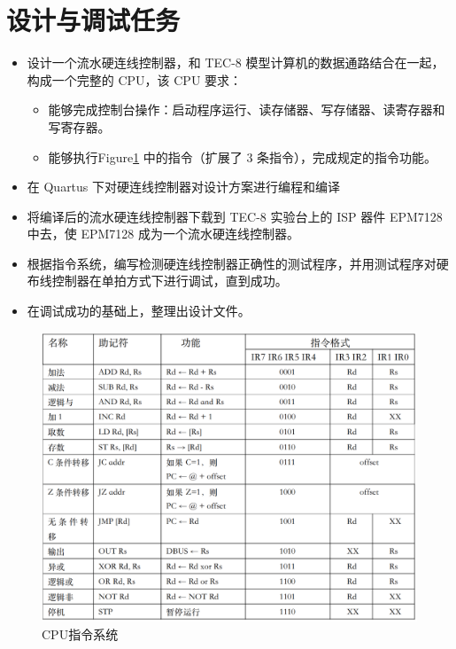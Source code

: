 \documentclass[12pt]{article}
\begin{document}
{\section{设计与调试任务}
    \begin{itemize}
        \item 设计一个流水硬连线控制器，和 TEC-8 模型计算机的数据通路结合在一起，构成一个完整的 CPU，该 CPU 要求：
        \begin{itemize}
            \item 能够完成控制台操作：启动程序运行、读存储器、写存储器、读寄存器和写寄存器。
            \item 能够执行Figure\ref{fig:3} 中的指令（扩展了 $3$ 条指令），完成规定的指令功能。
        \end{itemize}
        \item 在 Quartus \uppercase\expandafter{} 下对硬连线控制器对设计方案进行编程和编译
        \item 将编译后的流水硬连线控制器下载到 TEC-8 实验台上的 ISP 器件 EPM7128 中去，使 EPM7128 成为一个流水硬连线控制器。
        \item 根据指令系统，编写检测硬连线控制器正确性的测试程序，并用测试程序对硬布线控制器在单拍方式下进行调试，直到成功。
        \item 在调试成功的基础上，整理出设计文件。
    \end{itemize}
    
    \begin{figure}[!ht]
    	\centering
    	\includegraphics[width=1.0\textwidth]{指令系统.png}
    	\caption{CPU指令系统}
    	\centering
    	\label{fig:3}
    \end{figure}

}
\end{document}
